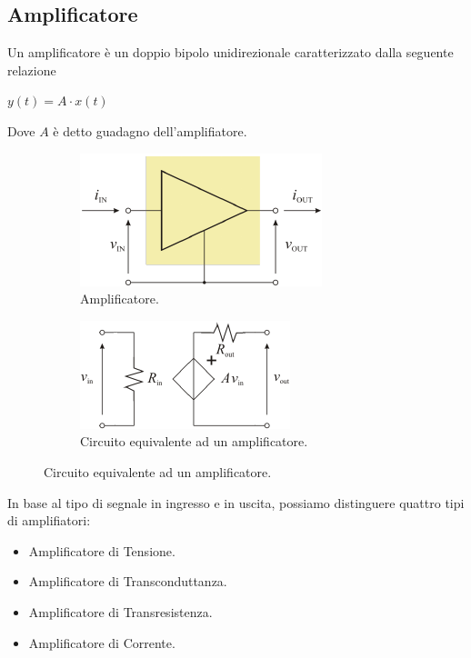 \documentclass[a4paper]{article}
\begin{document}
		\subsection{Amplificatore}
			Un amplificatore è un doppio bipolo unidirezionale caratterizzato dalla seguente relazione
			\begin{center}
				$ y(t) = A \cdot x(t) $
			\end{center}
			\newline
			Dove $ A $ è detto guadagno dell'amplifiatore.
			\begin{figure}[h!]
				\centering
				\begin{subfigure}{0.4\textwidth}
					\centering
					\includegraphics[scale=0.7]{amplificatore}
					\caption{Amplificatore.}
				\end{subfigure}
				\begin{subfigure}{0.4\textwidth}
					\centering
					\includegraphics[scale=0.7]{amplificatoreCircuito}
					\caption{Circuito equivalente ad un amplificatore.}
				\end{subfigure}
				\label{fig:amplificatore}
			\end{figure}
			\newpage
			In base al tipo di segnale in ingresso e in uscita, possiamo distinguere quattro tipi di amplifiatori:
			\begin{itemize}
				\item Amplificatore di Tensione.
				\item Amplificatore di Transconduttanza.
				\item Amplificatore di Transresistenza.
				\item Amplificatore di Corrente.
			\end{itemize}
\end{document}
